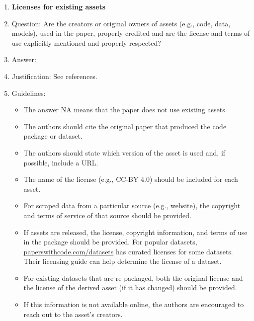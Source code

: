 \documentclass{article}
\begin{document}
\begin{enumerate}
\item {\bf Licenses for existing assets}
    \item[] Question: Are the creators or original owners of assets (e.g., code, data, models), used in the paper, properly credited and are the license and terms of use explicitly mentioned and properly respected?
    \item[] Answer: \answerYes{} %
    \item[] Justification: See references.
    \item[] Guidelines:
    \begin{itemize}
        \item The answer NA means that the paper does not use existing assets.
        \item The authors should cite the original paper that produced the code package or dataset.
        \item The authors should state which version of the asset is used and, if possible, include a URL.
        \item The name of the license (e.g., CC-BY 4.0) should be included for each asset.
        \item For scraped data from a particular source (e.g., website), the copyright and terms of service of that source should be provided.
        \item If assets are released, the license, copyright information, and terms of use in the package should be provided. For popular datasets, \url{paperswithcode.com/datasets} has curated licenses for some datasets. Their licensing guide can help determine the license of a dataset.
        \item For existing datasets that are re-packaged, both the original license and the license of the derived asset (if it has changed) should be provided.
        \item If this information is not available online, the authors are encouraged to reach out to the asset's creators.
    \end{itemize}


\end{enumerate}
\end{document}
